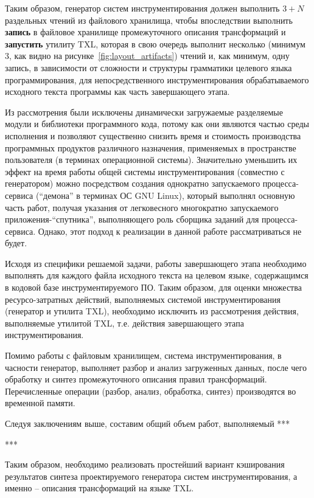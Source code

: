 Таким образом, генератор систем инструментирования должен выполнить $3 + N$ раздельных чтений из файлового хранилища, чтобы впоследствии выполнить \textbf{запись} в файловое хранилище промежуточного описания трансформаций и \textbf{запустить} утилиту TXL, которая в свою очередь выполнит несколько (минимум $3$, как видно на рисунке~\ref{fig:layout_artifacts}) чтений и, как минимум, одну запись, в зависимости от сложности и структуры грамматики целевого языка программирования, для непосредственного инструментирования обрабатываемого исходного текста программы как часть завершающего этапа.

Из рассмотрения были исключены динамически загружаемые разделяемые модули и библиотеки программного кода, потому как они являются частью среды исполнения и позволяют существенно снизить время и стоимость производства программных продуктов различного назначения, применяемых в пространстве пользователя (в терминах операционной системы).
Значительно уменьшить их эффект на время работы общей системы инструментирования (совместно с генератором) можно посредством создания однократно запускаемого процесса-сервиса (``демона'' в терминах ОС GNU Linux), который выполнял основную часть работ, получая указания от легковесного многократно запускаемого приложения-``спутника'', выполняющего роль сборщика заданий для процесса-сервиса.
Однако, этот подход к реализации в данной работе рассматриваться не будет.


Исходя из специфики решаемой задачи, работы завершающего этапа необходимо выполнять для каждого файла исходного текста на целевом языке, содержащимся в кодовой базе инструментируемого ПО.
Таким образом, для оценки множества ресурсо-затратных действий, выполняемых системой инструментирования (генератор и утилита TXL), необходимо исключить из рассмотрения действия, выполняемые утилитой TXL, т.е. действия завершающего этапа инструментирования.

Помимо работы с файловым хранилищем, система инструментирования, в часности генератор, выполняет разбор и анализ загруженных данных, после чего обработку и синтез промежуточного описания правил трансформаций.
Перечисленные операции (разбор, анализ, обработка, синтез) производятся во временной памяти.

Следуя заключениям выше, составим общий объем работ, выполняемый ***

***

Таким образом, необходимо реализовать простейший вариант кэширования результатов синтеза проектируемого генератора систем инструментирования, а именно -- описания трансформаций на языке TXL.

